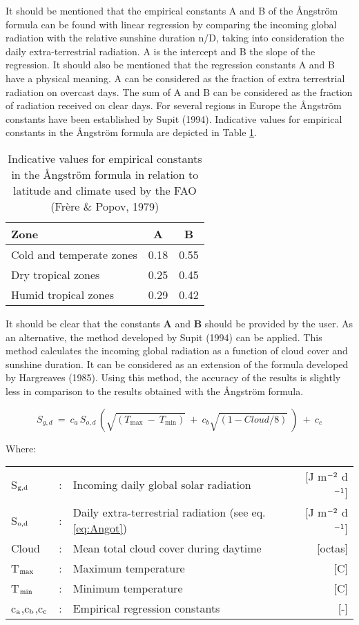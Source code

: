 It should be mentioned that the empirical constants A and B of the \AA ngstr\"{o}m formula 
can be found with linear regression by comparing the incoming global radiation with the
relative sunshine duration n/D, taking into consideration the daily extra-terrestrial
radiation. A is the intercept and B the slope of the regression. It should also be mentioned
that the regression constants A and B have a physical meaning. A can be considered as
the fraction of extra terrestrial radiation on overcast days. The sum of A and B can be
considered as the fraction of radiation received on clear days.
For several regions in Europe the \AA ngstr\"{o}m constants have been established by Supit
(1994). Indicative values for empirical constants in the \AA ngstr\"{o}m formula are 
depicted in Table \ref{tab:angstAB}.

\begin{table}
	\centering
	\caption{Indicative values for empirical constants in the \AA ngstr\"{o}m formula in
		relation to latitude and climate used by the FAO (Fr\`{e}re \& Popov, 1979)}
	\label{tab:angstAB}
	\begin{tabular}{lcc}
		\hline
		Zone &   A &  B  \\
		\hline
		Cold and temperate zones   &  0.18 &  0.55\\
		Dry tropical zones  &   0.25  & 0.45\\
		Humid tropical zones  &   0.29 &  0.42\\
		\hline
	\end{tabular}
\end{table}

It should be clear that the constants {\bf A} and {\bf B} should be
provided by the user. As an alternative, the method developed by Supit
(1994) can be applied. This method calculates the incoming global
radiation as a function of cloud cover and sunshine duration. It can be considered as an
extension of the formula developed by Hargreaves (1985). 
Using this method, the accuracy of the results is slightly less in comparison to 
the results obtained with the \AA ngstr\"{o}m formula.

\begin{equation}
S _{g,d} ~=~ c _{a} \, S _{o,d} \, (\sqrt{(T _{\max} ~-~T _{\min} )} ~+~ 
c _{b} \sqrt{(1-{Cloud/8})} ~) ~+~c _{c} 
\end{equation}

Where:\\[5pt]
\begin{tabularx}{\textwidth}{llXr}
	S$_{{\rm g,d}}$ &:& Incoming daily global solar radiation  & [J m$^{{\rm -2}}$ d$^{{\rm -1}}$]\\
	S$_{{\rm o,d}}$ &:& Daily extra-terrestrial radiation (see eq. \ref{eq:Angot})  & 
	[J m$^{{\rm -2}}$ d$^{{\rm -1}}$]\\
	Cloud &:& Mean total cloud cover during daytime  & [octas]\\
	T$_{{\rm max}}$ &:& Maximum temperature  & [\textdegree C]\\
	T$_{{\rm min}}$ &:& Minimum temperature  & [\textdegree C]\\
	c$_{{\rm a}}$,c$_{{\rm b}}$,c$_{{\rm c}}$ &:& Empirical regression constants   & [-]
\end{tabularx}

